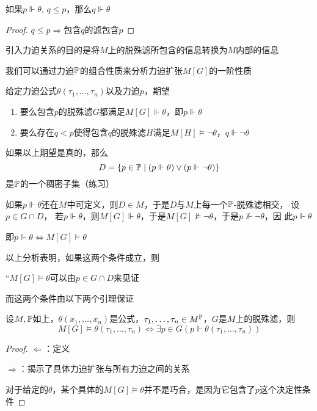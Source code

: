 \documentclass[11pt]{article}
\begin{document}
\begin{lemma}[]
如果\(p\Vdash\theta\), \(q\le p\)，那么\(q\Vdash\theta\)
\end{lemma}

\begin{proof}
\(q\le p\Rightarrow\)包含\(q\)的滤包含\(p\)
\end{proof}

引入力迫关系的目的是将\(M\)上的脱殊滤所包含的信息转换为\(M\)内部的信息

我们可以通过力迫\(\P\)的组合性质来分析力迫扩张\(M[G]\)的一阶性质

给定力迫公式\(\theta(\tau_1,\dots,\tau_n)\)以及力迫\(p\)，期望
\begin{enumerate}
\item 要么包含\(p\)的脱殊滤\(G\)都满足\(M[G]\Vdash\theta\)，即\(p\Vdash\theta\)
\item 要么存在\(q<p\)使得包含\(q\)的脱殊滤\(H\)满足\(M[H]\vDash\neg\theta\)，\(q\Vdash\neg\theta\)
\end{enumerate}


如果以上期望是真的，那么
\begin{equation*}
D=\{p\in\P\mid(p\Vdash\theta)\vee(p\Vdash\neg\theta)\}
\end{equation*}
是\(\P\)的一个稠密子集（练习）

如果\(p\Vdash\theta\)还在\(M\)中可定义，则\(D\in M\)，于是\(D\)与\(M\)上每一个\(\P\)-脱殊滤相交，
设\(p\in G\cap D\)，
若\(p\Vdash\theta\)，则\(M[G]\Vdash\theta\)，于是\(M[G]\not\vDash\neg\theta\)，于是\(p\not\Vdash\neg\theta\)，因
此\(p\Vdash\theta\)

即\(p\Vdash\theta\Leftrightarrow M[G]\vDash\theta\)

以上分析表明，如果这两个条件成立，则

“\(M[G]\vDash\theta\)可以由\(p\in G\cap D\)来见证

而这两个条件由以下两个引理保证
\begin{lemma}[真相引理]
设\(M,\P\)如上，\(\theta(x_1,\dots,x_n)\)是公式，\(\tau_1,\dots,\tau_n\in M^{\P}\)，\(G\)是\(M\)上的脱殊滤，则
\begin{equation*}
M[G]\vDash\theta(\tau_1,\dots,\tau_n)\Leftrightarrow\exists p\in G(p\Vdash\theta(\tau_1,\dots,\tau_n))
\end{equation*}
\end{lemma}

\begin{proof}
\(\Leftarrow\)：定义

\(\Rightarrow\)：揭示了具体力迫扩张与所有力迫之间的关系

对于给定的\(\theta\)，某个具体的\(M[G]\vDash\theta\)并不是巧合，是因为它包含了\(p\)这个决定性条件
\end{proof}
\end{document}

